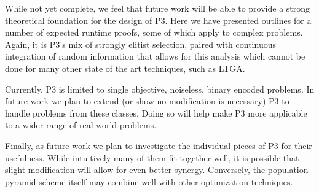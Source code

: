 \documentclass{sig-alternate}
\begin{document}
While not yet complete, we feel that future work will be able to provide a strong
theoretical foundation for the design of P3.  Here we have presented outlines
for a number of expected runtime proofs, some of which apply to complex problems.
Again, it is P3's mix of strongly elitist selection, paired with continuous integration
of random information that allows for this analysis which cannot be done for many
other state of the art techniques, such as LTGA.

Currently, P3 is limited to single objective, noiseless, binary encoded problems.
In future work we plan to extend (or show no modification is necessary) P3 to handle
problems from these classes.  Doing so will help make P3 more applicable to a wider
range of real world problems.

Finally, as future work we plan to investigate the individual pieces of P3 for
their usefulness.  While intuitively many of them fit together well, it is possible
that slight modification will allow for even better synergy.  Conversely, the population
pyramid scheme itself may combine well with other optimization techniques.

%

%
%
\balancecolumns
\end{document}
